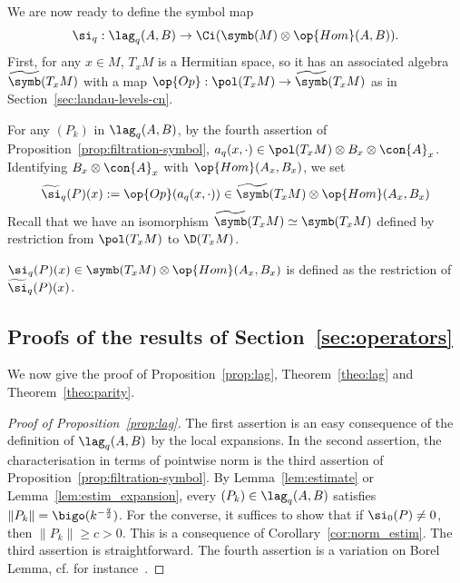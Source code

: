 We are now ready to define the symbol map
\[
\si_q : \lag_q (A,B) \rightarrow \Ci (
\symb(M) \otimes \op{Hom} (A,B)).
\]
First, for any $x \in M$, $T_xM$ is a Hermitian space, so it has an associated algebra $\widetilde{\symb} (T_xM)$ with a map $\op{Op}:\pol (T_xM) \rightarrow \widetilde{\symb} (T_xM)$ as in Section~\ref{sec:landau-levels-cn}.

For any $(P_k)$ in $\lag_q (A,B)$, by the fourth assertion of Proposition~\ref{prop:filtration-symbol}, $a_q(x,
\cdot) \in \pol (T_xM) \otimes B_x \otimes \con{A}_x$. Identifying $B_x
\otimes \con{A}_x$ with $ \op{Hom} (A_x, B_x)$, we set
\begin{gather}\label{eq:def_si_tilde}
\widetilde{ \si}_q (P) (x) := \op{Op} (a_q(x, \cdot)) \in
\widetilde{\symb} (T_xM) \otimes \op{Hom}(A_x, B_x)
\end{gather}
Recall that we have an isomorphism $\widetilde{\symb} (T_xM) \simeq \symb (T_xM)$ defined by restriction from $\pol (T_xM)$ to $\D (T_xM)$.

\begin{defi}\label{def:symbol}
$\si _q (P) (x) \in \symb (T_xM) \otimes \op{Hom}(A_x, B_x)$ is defined as the restriction of $\widetilde{\si}_q (P) (x)$.
\end{defi}

\subsection{Proofs of the results of Section~\ref{sec:operators}} \label{sec:proofs-results}
We now give the proof of Proposition~\ref{prop:lag}, Theorem~\ref{theo:lag} and Theorem~\ref{theo:parity}.

\begin{proof}[Proof of Proposition~\ref{prop:lag}]
The first assertion is an easy consequence of the definition of $\lag_q (A,B)$ by the local expansions. In the second assertion, the characterisation in terms of pointwise norm is the third assertion of Proposition~\ref{prop:filtration-symbol}. By Lemma~\ref{lem:estimate} or Lemma~\ref{lem:estim_expansion}, every $(P_k) \in \lag_q(A,B)$ satisfies $\| P_k \| = \bigo (k^{-\frac{q}{2}})$. For the converse, it suffices to show that if $\si_0 (P) \neq 0$, then $\| P _k \| \geqslant c >0$. This is a consequence of Corollary~\ref{cor:norm_estim}. The third assertion is straightforward. The fourth assertion is a variation on Borel Lemma, cf. for instance~\cite[Proposition~2.1]{oim}.
\end{proof}

